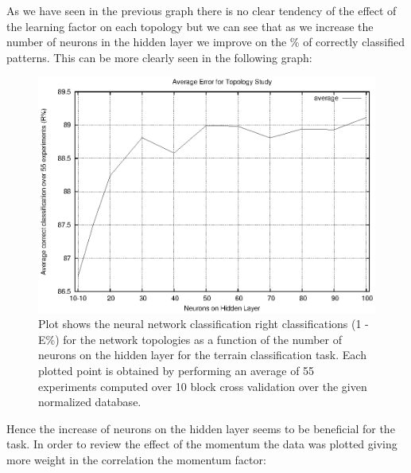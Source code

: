 \documentclass[a4paper,10pt,titlepage]{article}
\begin{document}
\par As we have seen in the previous graph there is no clear tendency of the effect of the learning factor on each topology but we can see that as we increase the number of neurons in the hidden layer we improve on the \% of correctly classified patterns. This can be more clearly seen in the following graph:

\begin{figure}[H]
	\centerline{%
	\includegraphics[]{average_error.eps}
	}
	\caption[Terrain classification task: Average correctly classified patterns per Topology]{Plot shows the neural network classification right classifications (1 - E\%) for the network topologies as a function of the number of neurons on the hidden layer for the  terrain classification task. Each plotted point is obtained by performing an average of 55 experiments computed over 10 block cross validation over the given normalized database.}
\end{figure}

\par Hence the increase of neurons on the hidden layer seems to be beneficial for the task. In order to review the effect of the momentum the data was plotted giving more weight in the correlation the momentum factor:
\end{document}
